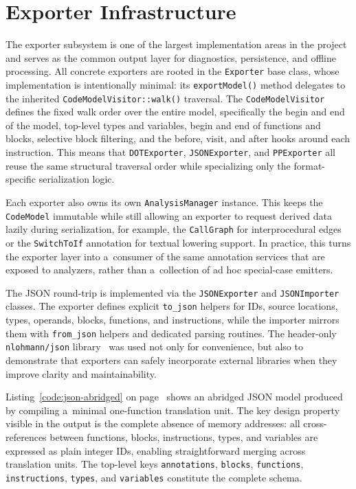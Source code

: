 \documentclass[xpsejal00-gcc-plugin.tex]{subfiles}
\begin{document}
\section{Exporter Infrastructure}\label{sec:exporter-infrastructure}

The exporter subsystem is one of the largest implementation areas in the project and serves as the common output layer for diagnostics, persistence, and offline processing.
All concrete exporters are rooted in the \texttt{Exporter} base class, whose implementation is intentionally minimal: its \texttt{exportModel()} method delegates to the inherited \texttt{CodeModelVisitor::walk()} traversal.
The \texttt{CodeModelVisitor} defines the fixed walk order over the entire model, specifically the begin and end of the model, top-level types and variables, begin and end of functions and blocks, selective block filtering, and the before, visit, and after hooks around each instruction.
This means that \texttt{DOTExporter}, \texttt{JSONExporter}, and \texttt{PPExporter} all reuse the same structural traversal order while specializing only the format-specific serialization logic.

Each exporter also owns its own \texttt{AnalysisManager} instance.
This keeps the \texttt{CodeModel} immutable while still allowing an exporter to request derived data lazily during serialization, for example, the \texttt{CallGraph} for interprocedural edges or the \texttt{SwitchToIf} annotation for textual lowering support.
In practice, this turns the exporter layer into a~consumer of the same annotation services that are exposed to analyzers, rather than a~collection of ad hoc special-case emitters.

The JSON round-trip is implemented via the \texttt{JSONExporter} and \texttt{JSONImporter} classes.
The exporter defines explicit \texttt{to\_json} helpers for IDs, source locations, types, operands, blocks, functions, and instructions, while the importer mirrors them with \texttt{from\_json} helpers and dedicated parsing routines.
The header-only \texttt{nlohmann/json} library~\cite{nlohmannJson} was used not only for convenience, but also to demonstrate that exporters can safely incorporate external libraries when they improve clarity and maintainability.

Listing~\ref{code:json-abridged} on page~\pageref{code:json-abridged} shows an abridged JSON model produced by compiling a~minimal one-function translation unit.
The key design property visible in the output is the complete absence of memory addresses: all cross-references between functions, blocks, instructions, types, and variables are expressed as plain integer IDs, enabling straightforward merging across translation units.
The top-level keys \texttt{annotations}, \texttt{blocks}, \texttt{functions}, \texttt{instructions}, \texttt{types}, and \texttt{variables} constitute the complete schema.
\end{document}
